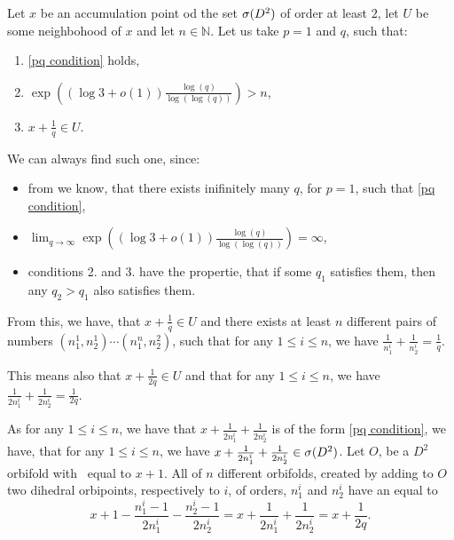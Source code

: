 Let $x$ be an accumulation point od the set ${{\sigma}(D^2)}$ of order at least $2$, let $U$ be 
some neighbohood of $x$ and let $n \in \mathbb{N}$. Let us take $p = 1$ and $q$, such that:
\begin{enumerate} \label{choice for q}
\item \ref{pq condition} holds, 
\item$\exp\left((\log{3}+o(1))\frac{\log(q)}{\log(\log(q))}\right) > n$,
\item $x + \frac{1}{q} \in U$. 
\end{enumerate}
We can always find such one, since:
\begin{itemize} 
\item from \cite{Browning2011} we know, that there exists 
inifinitely many $q$, for $p = 1$, such that \ref{pq condition}, 
\item
$\lim_{q \to \infty }\exp\left((\log{3}+o(1))\frac{\log(q)}{\log(\log(q))}\right) = \infty$,
\item conditions 2. and 3. have the propertie, that if some $q_1$ satisfies them, 
then any $q_2 > q_1$ also satisfies them. 
\end{itemize}
From this, we have, that $x + \frac{1}{q} \in U$ and there exists at least $n$ different pairs of numbers $(n_1^1, n_2^1)\cdots (n_1^n, n_2^2)$, such that for any $1 \leq i \leq n$, we have 
$\frac{1}{n_1^i}+\frac{1}{n_2^i} = \frac{1}{q}$. 

This means also that $x + \frac{1}{2q} \in U$ and that for any $1 \leq i \leq n$, we have 
$\frac{1}{2n_1^i}+\frac{1}{2n_2^i} = \frac{1}{2q}$. 

As for any $1 \leq i \leq n$, we have that  $x + \frac{1}{2n_1^i}+\frac{1}{2n_2^i}$ 
is of the form \ref{pq condition}, we have, that for any $1 \leq i \leq n$, we have 
$x + \frac{1}{2n_1^i}+\frac{1}{2n_2^i} \in {{\sigma}(D^2)}$. 
Let $O$, be a $D^2$ orbifold with 
\Eoc\ equal to $x+1$. All of $n$ different orbifolds, created by adding to $O$ two dihedral 
orbipoints, respectively to $i$, of orders, $n_1^i$ and $n_2^i$ have an \Eoc equal to 
\begin{equation}
x + 1 - \frac{n_1^i-1}{2n_1^i} - \frac{n_2^i-1}{2n_2^i} = 
x + \frac{1}{2n_1^i} + \frac{1}{2n_2^i} = x + \frac{1}{2q}.
\end{equation} 


